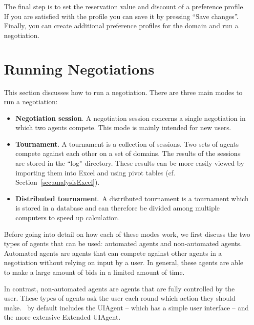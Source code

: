 \documentclass[]{article}
\begin{document}
The final step is to set the reservation value and discount of a preference profile. If you are satisfied with the profile you can save it by pressing ``Save changes''. Finally, you can create additional preference profiles for the domain and run a negotiation.

\section{Running Negotiations}
This section discusses how to run a negotiation. There are three main modes to run a negotiation:

\begin{itemize}
	\item \textbf{Negotiation session}. A negotiation session concerns a single negotiation in which two agents compete. This mode is mainly intended for new users.
	\item \textbf{Tournament}. A tournament is a collection of sessions. Two sets of agents compete against each other on a set of domains. The results of the sessions are stored in the ``log'' directory. These results can be more easily viewed by importing them into Excel and using pivot tables (cf. Section~\ref{sec:analysisExcel}).
	\item \textbf{Distributed tournament}. A distributed tournament is a tournament which is stored in a database and can therefore be divided among multiple computers to speed up calculation.
\end{itemize}

Before going into detail on how each of these modes work, we first discuss the two types of agents that can be used: automated agents and non-automated agents. Automated agents are agents that can compete against other agents in a negotiation without relying on input by a user. In general, these agents are able to make a large amount of bids in a limited amount of time.

In contrast, non-automated agents are agents that are fully controlled by the user. These types of agents ask the user each round which action they should make. \Genius~by default includes the UIAgent -- which has a simple user interface -- and the more extensive Extended UIAgent.
\end{document}
